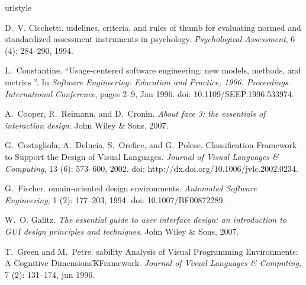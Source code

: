 \documentclass[10pt]{sigplanconf}
\begin{document}

\begin{thebibliography}{15}
\providecommand{\natexlab}[1]{#1}
\providecommand{\url}[1]{\textsl{#1}}
\expandafter\ifx\csname urlstyle\endcsname\relax
  \providecommand{\doi}[1]{doi: #1}\else
  \providecommand{\doi}{doi: \begingroup \urlstyle{rm}\Url}\fi

D.~V. {C}icchetti.
uidelines, criteria, and rules of thumb for evaluating normed and
  standardized assessment instruments in psychology.
\newblock \emph{Psychological Assessment}, 6 (4): 284--290,
  1994.

L.~{C}onstantine.
\newblock ``{Usage-centered} software engineering: new models, methods, and
  metrics ''.
\newblock In \emph{{S}oftware {E}ngineering: {E}ducation and {P}ractice, 1996.
  {P}roceedings. {I}nternational {C}onference}, pages 2--9, Jan 1996.
\newblock \doi{10.1109/SEEP.1996.533974}.

A.~{C}ooper, R.~{R}eimann, and D.~{C}ronin.
\newblock \emph{{A}bout face 3: the essentials of interaction design}.
\newblock John Wiley \& Sons, 2007.

G.~{C}ostagliola, A.~{D}elucia, S.~{O}refice, and G.~{P}olese.
 {C}lassification {F}ramework to {S}upport the {D}esign of
  {V}isual {L}anguages.
\newblock \emph{Journal of Visual Languages \& Computing}, 13
  (6): 573--600, 2002.
\newblock \doi{http://dx.doi.org/10.1006/jvlc.2002.0234}.

G.~{F}ischer.
omain-oriented design environments.
\newblock \emph{Automated Software Engineering}, 1 (2):
  177--203, 1994.
\newblock \doi{10.1007/BF00872289}.

W.~O. {G}alitz.
\newblock \emph{{T}he essential guide to user interface design: an introduction
  to {GUI} design principles and techniques}.
\newblock John Wiley \& Sons, 2007.

T.~{G}reen and M.~{P}etre.
sability {A}nalysis of {V}isual {P}rogramming {E}nvironments: {A}
  {C}ognitive {D}imensionsҠ{F}ramework.
\newblock \emph{Journal of Visual Languages \& Computing}, 7
  (2): 131--174, jun 1996.


\end{thebibliography}
\end{document}
